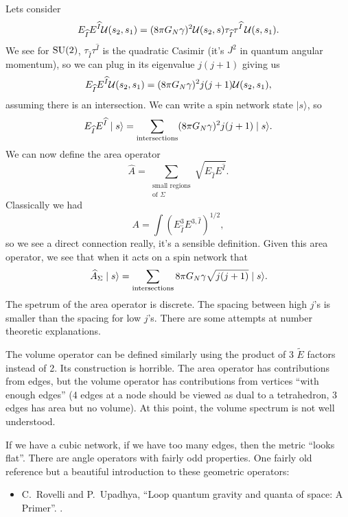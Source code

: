 Lets consider
\begin{equation}
E_{\widehat{I}}E^{\widehat{I}}\mathcal{U}(s_{2},s_{1}) =(8\pi G_{N}\gamma)^{2}\mathcal{U}(s_{2},s)\tau_{\widehat{I}}\tau^{\widehat{I}}\,\mathcal{U}(s,s_{1}).
\end{equation}
We see for $\operatorname{SU}(2)$, $\tau_{\widehat{I}}\tau^{\widehat{I}}$ is the
quadratic Casimir (it's $J^{2}$ in quantum angular momentum), so we can
plug in its eigenvalue $j(j+1)$ giving us
\begin{equation}
E_{\widehat{I}}E^{\widehat{I}}\mathcal{U}(s_{2},s_{1}) =(8\pi G_{N}\gamma)^{2}j(j+1)\mathcal{U}(s_{2},s_{1}),
\end{equation}
assuming there is an intersection. We can write a spin network state
$\mid s\rangle$, so
\begin{equation}
E_{\widehat{I}}E^{\widehat{I}}\mid s\rangle = \sum_{\text{intersections}}(8\pi G_{N}\gamma)^{2}j(j+1)\mid s\rangle.
\end{equation}
We can now define the area operator
\begin{equation}
\widehat{A} = \sum_{\substack{\text{small regions}\\\text{of }\Sigma}}\sqrt{E_{\widehat{I}}E^{\widehat{I}}}.
\end{equation}
Classically we had
\begin{equation}
A = \int (E^{3}_{\widehat{I}}E^{3,\widehat{I}})^{1/2},
\end{equation}
so we see a direct connection really, it's a sensible definition. Given
this area operator, we see that when it acts on a spin network that
\begin{equation}
\widehat{A}_{\Sigma}\mid s\rangle = \sum_{\text{intersections}}8\pi G_{N}\gamma\sqrt{j(j+1)}\mid s\rangle.
\end{equation}
The spetrum of the area operator is discrete. The spacing between high
$j$'s is smaller than the spacing for low $j$'s. There are some attempts
at number theoretic explanations.

The volume operator can be defined similarly using the product of 3
$\widetilde{E}$ factors instead of 2. Its construction is horrible. The
area operator has contributions from edges, but the volume operator has
contributions from vertices ``with enough edges'' (4 edges at a node
should be viewed as dual to a tetrahedron, 3 edges has area but no
volume). At this point, the volume spectrum is not well understood.

If we have a cubic network, if we have too many edges, then the metric
``looks flat''. There are angle operators with fairly odd properties.
One fairly old reference but a beautiful introduction to these geometric
operators:
\begin{itemize}
\item C.~Rovelli and P.~Upadhya,
``Loop quantum gravity and quanta of space: A Primer''.
.
\end{itemize}
